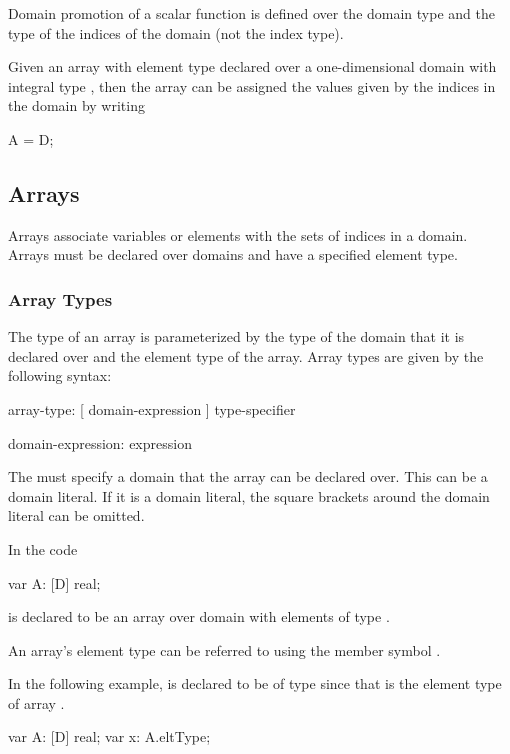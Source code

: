 Domain promotion of a scalar function is defined over the domain type
and the type of the indices of the domain (not the index type).

\begin{example}
Given an array  with element type  declared over a
one-dimensional domain  with integral type , then
the array can be assigned the values given by the indices in the
domain by writing
\begin{chapel}
A = D;
\end{chapel}
\end{example}

\subsection{Arrays}
\label{Arrays}

Arrays associate variables or elements with the sets of indices in a
domain.  Arrays must be declared over domains and have a specified
element type.

\subsubsection{Array Types}
\label{Array_Types}

The type of an array is parameterized by the type of the domain that
it is declared over and the element type of the array.  Array types
are given by the following syntax:
\begin{syntax}
array-type:
  [ domain-expression ] type-specifier

domain-expression:
  expression
\end{syntax}
The  must specify a domain that the array can
be declared over.  This can be a domain literal.  If it is a domain
literal, the square brackets around the domain literal can be omitted.

\begin{example}
In the code
\begin{chapel}
var A: [D] real;
\end{chapel}
 is declared to be an array over domain  with
elements of type .
\end{example}

An array's element type can be referred to using the member symbol
.

\begin{example}
In the following example,  is declared to be of type
 since that is the element type of array .
\begin{chapel}
var A: [D] real;
var x: A.eltType;
\end{chapel}
\end{example}

